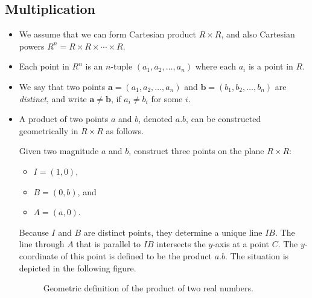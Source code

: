\documentclass[10pt]{article}
\newcommand{\ve}[1]{\mathbf{#1}}
\begin{document}
  \subsection{Multiplication} %
  \label{sub:multiplication}

  \begin{itemize}
  	\item We assume that we can form Cartesian product $R \times R$, and also Cartesian powers $R^n = R \times R \times \dotsb \times R$.

  	\item Each point in $R^n$  is an $n$-tuple $(a_1, a_2, \dotsc, a_n)$ where each $a_i$ is a point in $R$.

  	\item We say that two points $\ve{a} = (a_1, a_2, \dotsc, a_n)$ and $\ve{b} = (b_1, b_2, \dotsc, b_n)$ are \emph{distinct}, and write $\ve{a} \neq \ve{b}$, if $a_i \neq b_i$ for some $i$.

  	\item A product of two points $a$ and $b$, denoted $a.b$, can be constructed geometrically in $R \times R$ as follows.

  	Given two magnitude $a$ and $b$, construct three points on the plane $R \times R$:
  	\begin{itemize}
  		\item $I = (1, 0)$,
  		\item $B = (0, b)$, and
  		\item $A = (a, 0)$.
  	\end{itemize}
  	Because $I$ and $B$ are distinct points, they determine a unique line $IB$. The line through $A$ that is parallel to $IB$ intersects the $y$-axis at a point $C$. The $y$-coordinate of this point is defined to be the product $a.b$. The situation is depicted in the following figure.

  	\begin{figure}[h]
  		\centering
  		\caption{Geometric definition of the product of two real numbers.}	
  	\end{figure}


\end{itemize}
\end{document}
